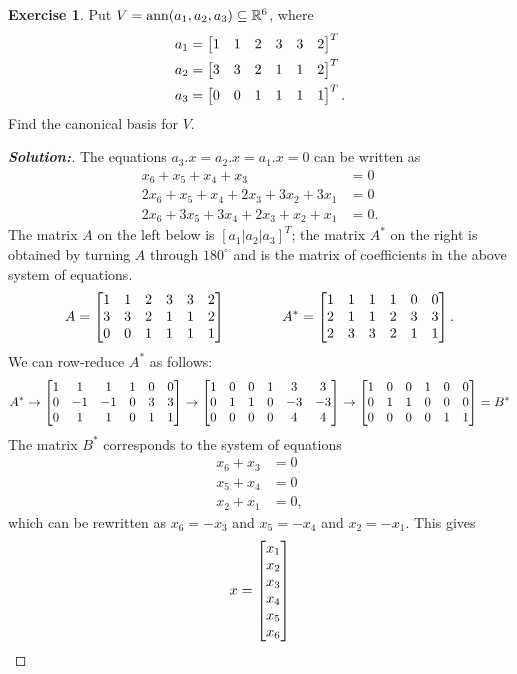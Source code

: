 \documentclass[a4paper]{amsart}
\theoremstyle{definition}
\newtheorem{exercise}{Exercise}
\newenvironment{solution}{\begin{proof}[\textbf{Solution:}] \vphantom{u}}{\end{proof}}
\begin{document}
\begin{exercise}\label{ex-ann-canonical-i}
 Put $V=\operatorname{ann}(a_1,a_2,a_3)\subseteq{\mathbb{R}}^6$, where 
 \begin{align*}
  a_1 &= \left[\begin{matrix} 1&1&2&3&3&2 \end{matrix}\right]^T \\
  a_2 &= \left[\begin{matrix} 3&3&2&1&1&2 \end{matrix}\right]^T \\
  a_3 &= \left[\begin{matrix} 0&0&1&1&1&1 \end{matrix}\right]^T.
 \end{align*}
 Find the canonical basis for $V$.
\end{exercise}
\begin{solution}
 The equations $a_3.x=a_2.x=a_1.x=0$ can be written as
 \begin{align*}
  x_6+x_5+x_4+x_3 &= 0 \\
  2x_6+x_5+x_4+2x_3+3x_2+3x_1 &= 0 \\
  2x_6+3x_5+3x_4+2x_3+x_2+x_1 &= 0.
 \end{align*}
 The matrix $A$ on the left below is $[a_1|a_2|a_3]^T$; the matrix
 $A^*$ on the right is obtained by turning $A$ through $180^\circ$ and
 is the matrix of coefficients in the above system of equations.
 \[ 
  A   = \left[\begin{matrix} 1&1&2&3&3&2 \\
             3&3&2&1&1&2 \\
             0&0&1&1&1&1 \end{matrix}\right] \hspace{4em}
  A^* = \left[\begin{matrix} 1&1&1&1&0&0 \\
             2&1&1&2&3&3 \\
             2&3&3&2&1&1 \end{matrix}\right].
 \]
 We can row-reduce $A^*$ as follows:
 \[ A^* \to 
     \left[\begin{matrix} 1&1&1&1&0&0 \\
          0&-1&-1&0&3&3 \\
          0&1&1&0&1&1 \end{matrix}\right]
     \to 
     \left[\begin{matrix} 1&0&0&1&3&3 \\
          0&1&1&0&-3&-3 \\
          0&0&0&0&4&4 \end{matrix}\right]
     \to 
     \left[\begin{matrix} 1&0&0&1&0&0 \\
          0&1&1&0&0&0 \\
          0&0&0&0&1&1 \end{matrix}\right]
    = B^*
 \]
 The matrix $B^*$ corresponds to the system of equations 
 \begin{align*}
  x_6+x_3 &= 0 \\
  x_5+x_4 &= 0 \\
  x_2+x_1 &= 0,
 \end{align*}
 which can be rewritten as $x_6=-x_3$ and $x_5=-x_4$ and $x_2=-x_1$.
 This gives
 \[ x = \left[\begin{matrix} x_1\\ x_2 \\ x_3 \\ x_4 \\ x_5 \\ x_6 \end{matrix}\right] 
\]
\end{solution}
\end{document}
